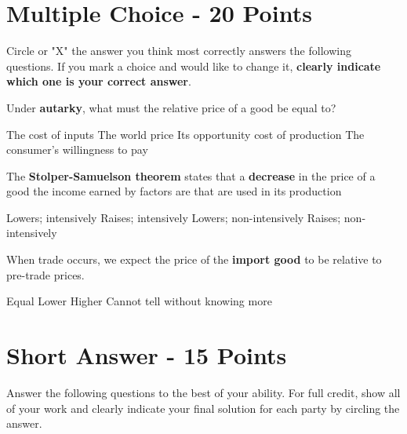 \documentclass[12pt]{exam}
\begin{document}
\section*{Multiple Choice - 20 Points}
Circle or "X" the answer you think most correctly answers the following questions. 
If you mark a choice and would like to change it, \textbf{clearly indicate which one is your correct answer}. 
\begin{questions}

\question[4] %
Under \textbf{autarky}, what must the relative price of a good be equal to?

    \begin{choices}
        \choice The cost of inputs
        \choice The world price
        \correctchoice Its opportunity cost of production
        \choice The consumer's willingness to pay
    \end{choices}

\question[4] %
The \textbf{Stolper-Samuelson theorem} states that a \textbf{decrease} in the price of a good \fillin[][0.5in] the income earned by factors are that are used \fillin[][0.5in] in its production
    \begin{choices}
        \correctchoice Lowers; intensively
        \choice Raises; intensively
        \choice Lowers; non-intensively
        \choice Raises; non-intensively
    \end{choices}

\question[4] %
When trade occurs, we expect the price of the \textbf{import good} to be \fillin[][0.5in] relative to pre-trade prices. 
    \begin{choices}
        \choice Equal
        \correctchoice Lower
        \choice Higher
        \choice Cannot tell without knowing more
    \end{choices}
\newpage
\section*{Short Answer - 15 Points}
Answer the following questions to the best of your ability.
For full credit, show all of your work and clearly indicate your final solution for each party by circling the answer.


\end{questions}
\end{document}
